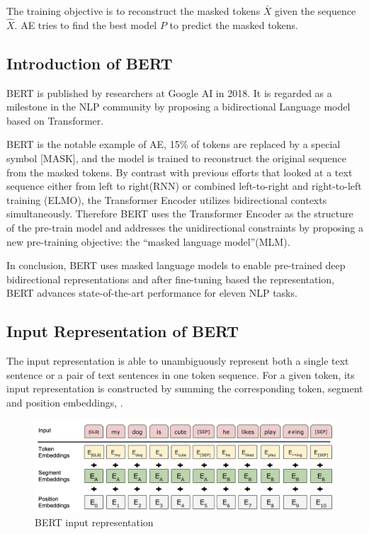 \documentclass[]{krantz}
\begin{document}
The training objective is to reconstruct the masked tokens \(\bar{X}\) given the sequence \(\hat{X}\). AE tries to find the best model \(P\) to predict the masked tokens.

\hypertarget{introduction-of-bert}{%
\subsection{Introduction of BERT}\label{introduction-of-bert}}

BERT is published by researchers at Google AI in 2018. It is regarded as a milestone in the NLP community by proposing a bidirectional Language model based on Transformer.

BERT is the notable example of AE, 15\% of tokens are replaced by a special symbol {[}MASK{]}, and the model is trained to reconstruct the original sequence from the masked tokens. By contrast with previous efforts that looked at a text sequence either from left to right(RNN) or combined left-to-right and right-to-left training (ELMO), the Transformer Encoder utilizes bidirectional contexts simultaneously. Therefore BERT uses the Transformer Encoder as the structure of the pre-train model and addresses the unidirectional constraints by proposing a new pre-training objective: the ``masked language model''(MLM).

In conclusion, BERT uses masked language models to enable pre-trained deep bidirectional representations and after fine-tuning based the representation, BERT advances state-of-the-art performance for eleven NLP tasks.

\hypertarget{input-representation-of-bert}{%
\subsection{Input Representation of BERT}\label{input-representation-of-bert}}

The input representation is able to unambiguously represent both a single text sentence or a pair of text sentences in one token sequence. For a given token, its input representation is constructed by summing the corresponding token, segment and position embeddings, \citet{bert}.

\begin{figure}

{\centering \includegraphics[width=0.8\linewidth]{figures/02-03-transfer-learning-for-nlp/bert_input_representation} 

}

\caption{BERT input representation}\label{fig:ch02-03-figure02}
\end{figure}
\end{document}

